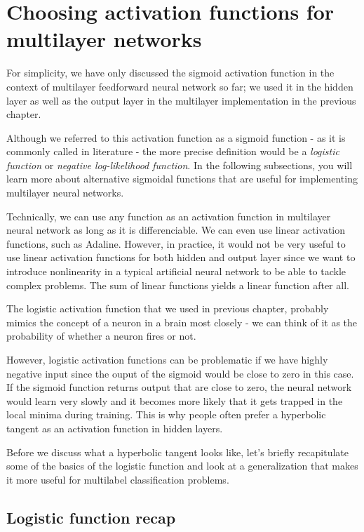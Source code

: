 \documentclass[11pt]{article}
\begin{document}
    \section{Choosing activation functions for multilayer
networks}\label{choosing-activation-functions-for-multilayer-networks}

    For simplicity, we have only discussed the sigmoid activation function
in the context of multilayer feedforward neural network so far; we used
it in the hidden layer as well as the output layer in the multilayer
implementation in the previous chapter.

Although we referred to this activation function as a sigmoid function -
as it is commonly called in literature - the more precise definition
would be a \emph{logistic function} or \emph{negative log-likelihood
function}. In the following subsections, you will learn more about
alternative sigmoidal functions that are useful for implementing
multilayer neural networks.

Technically, we can use any function as an activation function in
multilayer neural network as long as it is differenciable. We can even
use linear activation functions, such as Adaline. However, in practice,
it would not be very useful to use linear activation functions for both
hidden and output layer since we want to introduce nonlinearity in a
typical artificial neural network to be able to tackle complex problems.
The sum of linear functions yields a linear function after all.

The logistic activation function that we used in previous chapter,
probably mimics the concept of a neuron in a brain most closely - we can
think of it as the probability of whether a neuron fires or not.

However, logistic activation functions can be problematic if we have
highly negative input since the ouput of the sigmoid would be close to
zero in this case. If the sigmoid function returns output that are close
to zero, the neural network would learn very slowly and it becomes more
likely that it gets trapped in the local minima during training. This is
why people often prefer a hyperbolic tangent as an activation function
in hidden layers.

Before we discuss what a hyperbolic tangent looks like, let's briefly
recapitulate some of the basics of the logistic function and look at a
generalization that makes it more useful for multilabel classification
problems.

    \subsection{Logistic function recap}\label{logistic-function-recap}
\end{document}
